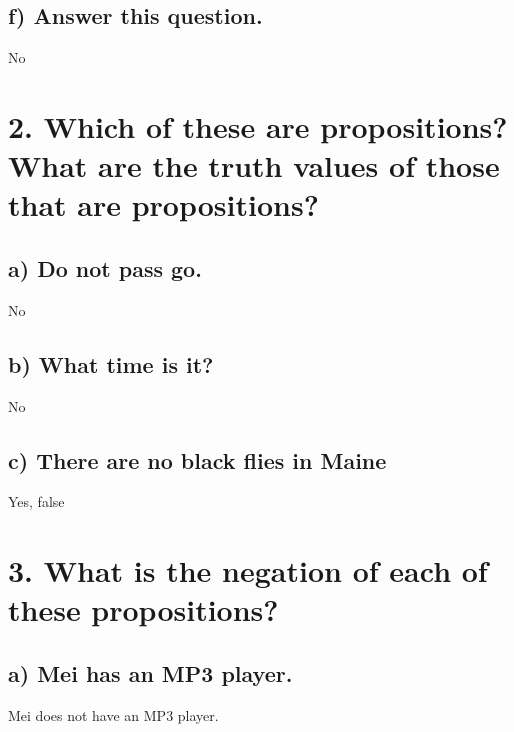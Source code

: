 \documentclass[11pt, oneside]{article} %
\numberwithin{equation}{section} %
\numberwithin{figure}{section} %
\numberwithin{table}{section} %
\begin{document}
\subsection{f) Answer this question.}
No





\section{2. Which of these are propositions? What are the truth values of those that are propositions?}


\subsection{a) Do not pass go.}
No
\subsection{b) What time is it?}
No
\subsection{c) There are no black flies in Maine}
Yes, false

\section{3. What is the negation of each of these propositions?}
\subsection{a) Mei has an MP3 player.}
Mei does not have an MP3 player.
\end{document}
